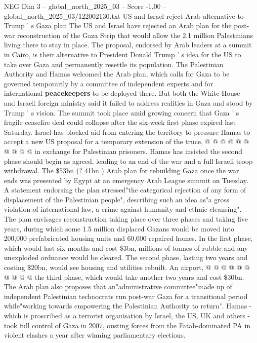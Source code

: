 \begin{textsample}{NEG Dim 3 – global\_north\_2025\_03 – Score -1.00 – global\_north\_2025\_03/122002130.txt}  \label{ex:f3_neg_432}
US and Israel reject Arab alternative to Trump ' s Gaza plan The US and Israel have rejected an Arab plan for the post-war reconstruction of the Gaza Strip that would allow the 2.1 million Palestinians living there to stay in place.
The proposal, endorsed by Arab leaders at a summit in Cairo, is their alternative to President Donald Trump ' s idea for the US to take over Gaza and permanently resettle its population.
The Palestinian Authority and Hamas welcomed the Arab plan, which calls for Gaza to be governed temporarily by a committee of independent experts and for international \textbf{peacekeepers} to be deployed there.
But both the White House and Israeli foreign ministry said it failed to address realities in Gaza and stood by Trump ' s vision.
The summit took place amid growing concern that Gaza ' s fragile ceasefire deal could collapse after the six-week first phase expired last Saturday.
Israel has blocked aid from entering the territory to pressure Hamas to accept a new US proposal for a temporary extension of the truce, @ @ @ @ @ @ @ @ @ @ in exchange for Palestinian prisoners.
Hamas has insisted the second phase should begin as agreed, leading to an end of the war and a full Israeli troop withdrawal.
The \$53bn (? 41bn ) Arab plan for rebuilding Gaza once the war ends was presented by Egypt at an emergency Arab League summit on Tuesday.
A statement endorsing the plan stressed"the categorical rejection of any form of displacement of the Palestinian people", describing such an idea as"a gross violation of international law, a crime against humanity and ethnic cleansing".
The plan envisages reconstruction taking place over three phases and taking five years, during which some 1.5 million displaced Gazans would be moved into 200,000 prefabricated housing units and 60,000 repaired homes.
In the first phase, which would last six months and cost \$3bn, millions of tonnes of rubble and any unexploded ordnance would be cleared.
The second phase, lasting two years and costing \$20bn, would see housing and utilities rebuilt.
An airport, @ @ @ @ @ @ @ @ @ @ the third phase, which would take another two years and cost \$30bn.
The Arab plan also proposes that an"administrative committee"made up of independent Palestinian technocrats run post-war Gaza for a transitional period while"working towards empowering the Palestinian Authority to return".
Hamas - which is proscribed as a terrorist organisation by Israel, the US, UK and others - took full control of Gaza in 2007, ousting forces from the Fatah-dominated PA in violent clashes a year after winning parliamentary elections.

\end{textsample}
